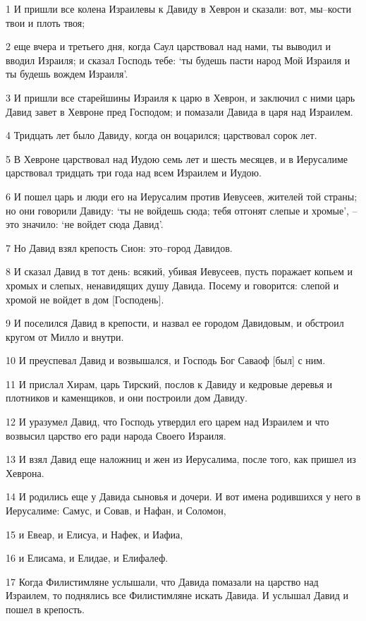 \par 1 И пришли все колена Израилевы к Давиду в Хеврон и сказали: вот, мы--кости твои и плоть твоя;
\par 2 еще вчера и третьего дня, когда Саул царствовал над нами, ты выводил и вводил Израиля; и сказал Господь тебе: `ты будешь пасти народ Мой Израиля и ты будешь вождем Израиля'.
\par 3 И пришли все старейшины Израиля к царю в Хеврон, и заключил с ними царь Давид завет в Хевроне пред Господом; и помазали Давида в царя над Израилем.
\par 4 Тридцать лет было Давиду, когда он воцарился; царствовал сорок лет.
\par 5 В Хевроне царствовал над Иудою семь лет и шесть месяцев, и в Иерусалиме царствовал тридцать три года над всем Израилем и Иудою.
\par 6 И пошел царь и люди его на Иерусалим против Иевусеев, жителей той страны; но они говорили Давиду: `ты не войдешь сюда; тебя отгонят слепые и хромые', --это значило: `не войдет сюда Давид'.
\par 7 Но Давид взял крепость Сион: это--город Давидов.
\par 8 И сказал Давид в тот день: всякий, убивая Иевусеев, пусть поражает копьем и хромых и слепых, ненавидящих душу Давида. Посему и говорится: слепой и хромой не войдет в дом [Господень].
\par 9 И поселился Давид в крепости, и назвал ее городом Давидовым, и обстроил кругом от Милло и внутри.
\par 10 И преуспевал Давид и возвышался, и Господь Бог Саваоф [был] с ним.
\par 11 И прислал Хирам, царь Тирский, послов к Давиду и кедровые деревья и плотников и каменщиков, и они построили дом Давиду.
\par 12 И уразумел Давид, что Господь утвердил его царем над Израилем и что возвысил царство его ради народа Своего Израиля.
\par 13 И взял Давид еще наложниц и жен из Иерусалима, после того, как пришел из Хеврона.
\par 14 И родились еще у Давида сыновья и дочери. И вот имена родившихся у него в Иерусалиме: Самус, и Совав, и Нафан, и Соломон,
\par 15 и Евеар, и Елисуа, и Нафек, и Иафиа,
\par 16 и Елисама, и Елидае, и Елифалеф.
\par 17 Когда Филистимляне услышали, что Давида помазали на царство над Израилем, то поднялись все Филистимляне искать Давида. И услышал Давид и пошел в крепость.
